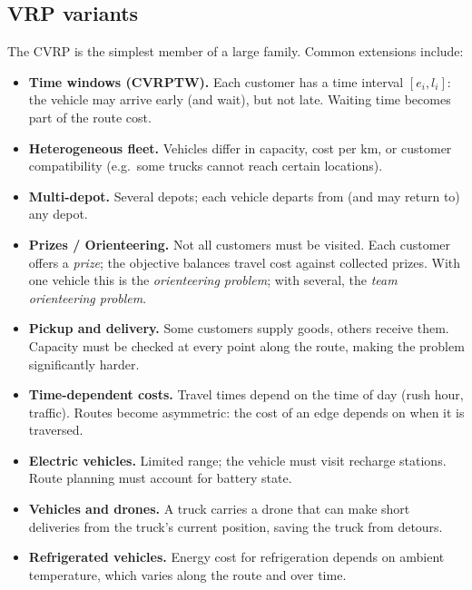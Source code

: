 \subsection{VRP variants}
\label{ssec:vrp-variants}

The CVRP is the simplest member of a large family.  Common
extensions include:

\begin{itemize}
  \item \textbf{Time windows (CVRPTW).}
    Each customer has a time interval $[e_i, l_i]$: the vehicle
    may arrive early (and wait), but not late.
    Waiting time becomes part of the route cost.

  \item \textbf{Heterogeneous fleet.}
    Vehicles differ in capacity, cost per km, or customer
    compatibility (e.g.\ some trucks cannot reach certain
    locations).

  \item \textbf{Multi-depot.}
    Several depots; each vehicle departs from (and may return to)
    any depot.

  \item \textbf{Prizes / Orienteering.}
    Not all customers must be visited.  Each customer offers a
    \emph{prize}; the objective balances travel cost against
    collected prizes.  With one vehicle this is the
    \emph{orienteering problem}; with several, the
    \emph{team orienteering problem}.

  \item \textbf{Pickup and delivery.}
    Some customers supply goods, others receive them.  Capacity
    must be checked at every point along the route, making the
    problem significantly harder.

  \item \textbf{Time-dependent costs.}
    Travel times depend on the time of day (rush hour, traffic).
    Routes become asymmetric: the cost of an edge depends on
    when it is traversed.

  \item \textbf{Electric vehicles.}
    Limited range; the vehicle must visit recharge stations.
    Route planning must account for battery state.

  \item \textbf{Vehicles and drones.}
    A truck carries a drone that can make short deliveries from
    the truck's current position, saving the truck from
    detours.

  \item \textbf{Refrigerated vehicles.}
    Energy cost for refrigeration depends on ambient temperature,
    which varies along the route and over time.
\end{itemize}


